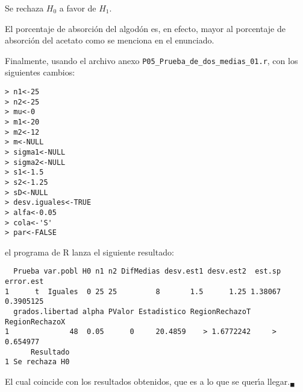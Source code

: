 \begin{solucion}
 \begin{decision}
  Se rechaza $H_0$ a favor de $H_1$.
 \end{decision}

 \begin{conclusion}
  El porcentaje de absorci\'on del algod\'on es, en efecto, mayor al porcentaje de absorci\'on del acetato como se menciona en el enunciado.
 \end{conclusion}

 Finalmente, usando el archivo anexo
 \texttt{P05\_Prueba\_de\_dos\_medias\_01.r},
 con los siguientes cambios:
 \begin{verbatim}
> n1<-25
> n2<-25
> mu<-0
> m1<-20
> m2<-12
> m<-NULL
> sigma1<-NULL
> sigma2<-NULL
> s1<-1.5
> s2<-1.25
> sD<-NULL
> desv.iguales<-TRUE
> alfa<-0.05
> cola<-'S'
> par<-FALSE
 \end{verbatim}
 \vspace{-0.5cm}
 el programa de R lanza el siguiente resultado:
 \begin{verbatim}
  Prueba var.pobl H0 n1 n2 DifMedias desv.est1 desv.est2  est.sp error.est
1      t  Iguales  0 25 25         8       1.5      1.25 1.38067 0.3905125
  grados.libertad alpha PValor Estadistico RegionRechazoT RegionRechazoX
1              48  0.05      0     20.4859    > 1.6772242     > 0.654977
      Resultado
1 Se rechaza H0
 \end{verbatim}
 \vspace{-0.5cm}
 El cual coincide con los resultados obtenidos,
 que es a lo que se quer\'{\i}a llegar.${}_{\blacksquare}$
\end{solucion}
